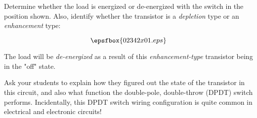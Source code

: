 

Determine whether the load is energized or de-energized with the switch in the position shown.  Also, identify whether the transistor is a {\it depletion} type or an {\it enhancement} type:

$$\epsfbox{02342x01.eps}$$







The load will be {\it de-energized} as a result of this {\it enhancement-type} transistor being in the "off" state.







Ask your students to explain how they figured out the state of the transistor in this circuit, and also what function the double-pole, double-throw (DPDT) switch performs.  Incidentally, this DPDT switch wiring configuration is quite common in electrical and electronic circuits!




